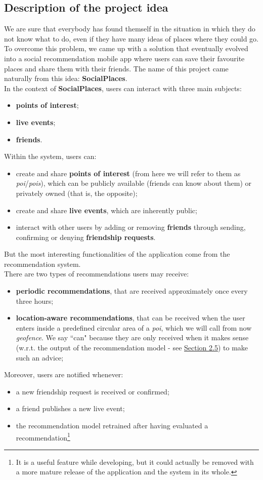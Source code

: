 \documentclass[../../main]{subfiles}
\begin{document}
\subsection{Description of the project idea}
\label{ss:description-project-idea}

We are sure that everybody has found themself in the situation in which they do not know what to do, even if they have many ideas of places where they could go.
To overcome this problem, we came up with a solution that eventually evolved into a social recommendation mobile app where users can save their favourite places and share them with their friends.
The name of this project came naturally from this idea: \textbf{SocialPlaces}.\\
In the context of \textbf{SocialPlaces}, users can interact with three main subjects:
\begin{itemize}
    \item \textbf{points of interest};
    \item \textbf{live events};
    \item \textbf{friends}.
\end{itemize}
Within the system, users can:
\begin{itemize}
    \item create and share \textbf{points of interest} (from here we will refer to them as \textit{poi}/\textit{pois}), which can be publicly available (friends can know about them) or privately owned (that is, the opposite);
    \item create and share \textbf{live events}, which are inherently public;
    \item interact with other users by adding or removing \textbf{friends} through sending, confirming or denying \textbf{friendship requests}.
\end{itemize}
But the most interesting functionalities of the application come from the recommendation system.\\
There are two types of recommendations users may receive:
\begin{itemize}
    \item \textbf{periodic recommendations}, that are received approximately once every three hours;
    \item \textbf{location-aware recommendations}, that can be received when the user enters inside a predefined circular area of a \textit{poi}, which we will call from now \textit{geofence}.
    We say ``can" because they are only received when it makes sense (w.r.t. the output of the recommendation model - see \hyperref[ss:recommendation-model]{Section 2.5}) to make such an advice;
\end{itemize}
Moreover, users are notified whenever:
\begin{itemize}
    \item a new friendship request is received or confirmed;
    \item a friend publishes a new live event;
    \item the recommendation model retrained after having evaluated a recommendation\footnote{It is a useful feature while developing, but it could actually be removed with a more mature release of the application and the system in its whole.}
\end{itemize}
\end{document}
